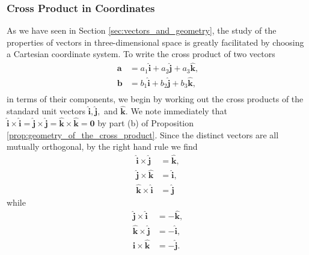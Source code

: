 \documentclass[12pt,letterpaper,reqno]{article}
\numberwithin{equation}{section}
\newcommand{\fixme}[1]{{\color{orange}{[#1]}}}
\begin{document}
\subsubsection{Cross Product in Coordinates}
As we have seen in Section \ref{sec:vectors_and_geometry}, the study of the properties of vectors in three-dimensional space is greatly facilitated by choosing a Cartesian coordinate system. To write the cross product of two vectors 
\begin{align*}
	\mathbf{a}&=a_1\mathbf{\hat{i}}+a_2\mathbf{\hat{j}}+a_3\mathbf{\hat{k}}, \\
	\mathbf{b}&=b_1\mathbf{\hat{i}}+b_2\mathbf{\hat{j}}+b_3\mathbf{\hat{k}}, \\
\end{align*}
in terms of their components, we begin by working out the cross products of the standard unit vectors $\mathbf{\hat{i}}, \mathbf{\hat{j}},$ and $\mathbf{\hat{k}}$. We note immediately that $\mathbf{\hat{i}} \times \mathbf{\hat{i}}=\mathbf{\hat{j}} \times \mathbf{\hat{j}}=\mathbf{\hat{k}} \times \mathbf{\hat{k}}=\mathbf{0}$ by part (b) of Proposition \ref{prop:geometry_of_the_cross_product}. Since the distinct vectors are all mutually orthogonal, by the right hand rule we find
\begin{align*}
	\mathbf{\hat{i}} \times \mathbf{\hat{j}}&=\mathbf{\hat{k}}, \\
	\mathbf{\hat{j}} \times \mathbf{\hat{k}}&=\mathbf{\hat{i}}, \\
	\mathbf{\hat{k}} \times \mathbf{\hat{i}}&=\mathbf{\hat{j}}
\end{align*}
while 
\begin{align*}
	\mathbf{\hat{j}} \times \mathbf{\hat{i}}&=-\mathbf{\hat{k}}, \\
	\mathbf{\hat{k}} \times \mathbf{\hat{j}}&=-\mathbf{\hat{i}}, \\
	\mathbf{\hat{i}} \times \mathbf{\hat{k}}&=-\mathbf{\hat{j}}.
\end{align*} 
\fixme{Insert wheel graphic.}
\end{document}
